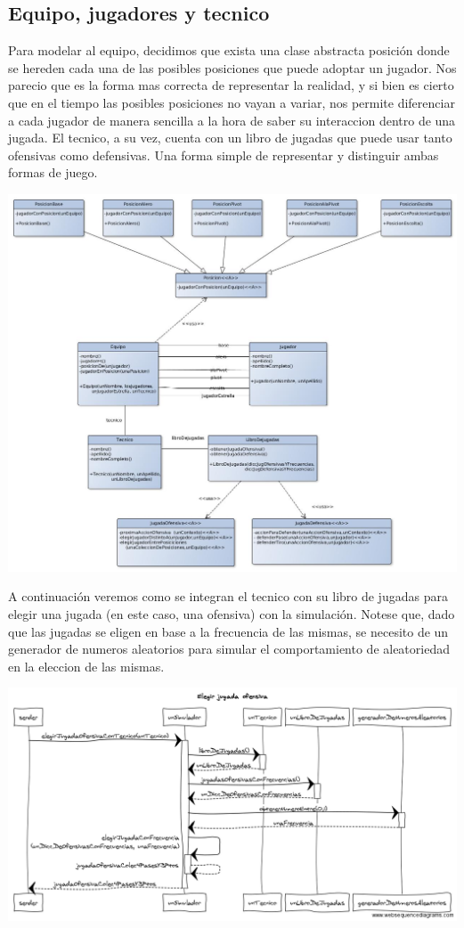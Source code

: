 \subsection{Equipo, jugadores y tecnico}
Para modelar al equipo, decidimos que exista una clase abstracta posición donde se hereden cada una de las posibles posiciones que puede adoptar un jugador. Nos parecio que es la forma mas correcta de representar la realidad, y si bien es cierto que en el tiempo las posibles posiciones no vayan a variar, nos permite diferenciar a cada jugador de manera sencilla a la hora de saber su interaccion dentro de una jugada. El tecnico, a su vez, cuenta con un libro de jugadas que puede usar tanto ofensivas como defensivas. Una forma simple de representar y distinguir ambas formas de juego.
\begin{center}
\includegraphics[scale=0.30]{diseno/equipo.jpg} 
\end{center}

A continuación veremos como se integran el tecnico con su libro de jugadas para elegir una jugada (en este caso, una ofensiva) con la simulación. Notese que, dado que las jugadas se eligen en base a la frecuencia de las mismas, se necesito de un generador de numeros aleatorios para simular el comportamiento de aleatoriedad en la eleccion de las mismas.
\begin{center}
\includegraphics[scale=0.30]{diseno/Elegir_jugada_ofensiva.png} 
\end{center}

